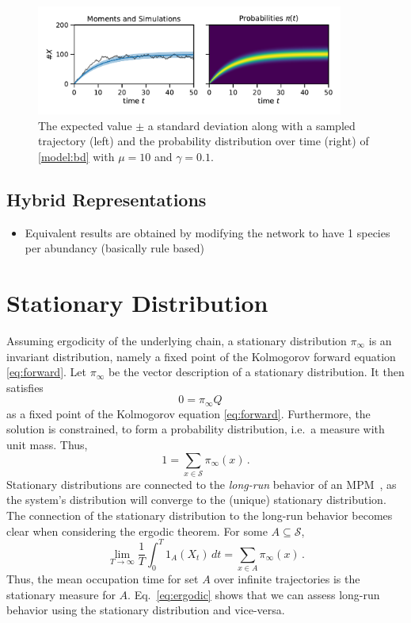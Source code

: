 \begin{figure}[htb]
	\centering
	\includegraphics[width=0.9\textwidth]{gfx/momsandprobs.pdf}
	\caption[Moments and probability distribution $\pi(t)$]{\label{fig:momsandprobs}The expected value $\pm$ a standard deviation along with a sampled trajectory (left) and the probability distribution over time (right) of \autoref{model:bd} with $\mu=10$ and $\gamma=0.1$.}
\end{figure}

\subsection{Hybrid Representations}
\begin{itemize}
	\item Equivalent results are obtained by modifying the network to have 1 species per abundancy (basically rule based)
\end{itemize}
\cite{hasenauer2014method,kazeroonian2014modeling,andreychenko2015reconstruction}

\section{Stationary Distribution}\label{sec:stationary_dist}
Assuming
ergodicity  
of the underlying chain, a stationary distribution $\pi_{\infty}$ is an invariant distribution, namely a fixed point of the Kolmogorov forward equation \eqref{eq:forward}.
Let $\pi_{\infty}$ be the vector description of a stationary distribution. It then  satisfies
\begin{equation}\label{eq:stationary}
0=\pi_{\infty}Q\quad
\end{equation}
as a fixed point of the Kolmogorov equation \eqref{eq:forward}.
Furthermore, the solution is constrained, to form a probability distribution, i.e.\ a measure with
unit mass. Thus,
\begin{equation}
1=\sum_{x\in\mathcal{S}}\pi_{\infty}(x)\,.
\end{equation}
Stationary distributions are connected to the \emph{long-run} behavior of an \ac{MPM}~\cite{dayar2011bounding}, as the system's distribution will converge to the (unique)
stationary distribution.
The connection of the stationary distribution to the long-run behavior becomes clear when considering the ergodic theorem. 
For some $A\subseteq\mathcal{S}$,
\begin{equation}\label{eq:ergodic}
    \lim_{T\to\infty}\frac{1}{T}\int_0^T 1_A(X_t)\,dt
    = \sum_{x\in A}\pi_{\infty}(x)\,.
\end{equation}
Thus, the mean occupation time for set $A$ over infinite trajectories is the stationary measure for $A$.
Eq.~\eqref{eq:ergodic} shows that we can assess long-run behavior using the stationary distribution and vice-versa.

